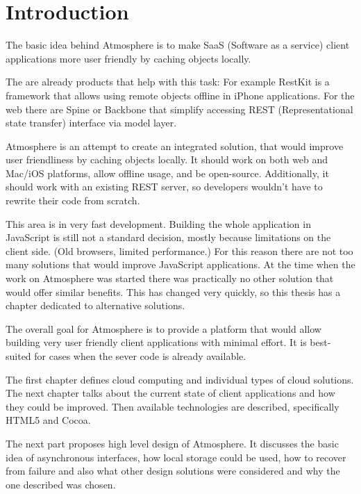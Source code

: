 \setcounter{page}{1}
\setcounter{equation}{0}
\setcounter{figure}{0}
\setcounter{table}{0}

\section*{Introduction}

The basic idea behind Atmosphere is to make SaaS (Software as a service) client applications more user friendly by caching objects locally.

The are already products that help with this task: For example RestKit \citep{restkit} is a framework that allows using remote objects offline in iPhone applications. For the web there are Spine or Backbone \citep{maccaw_js} that simplify accessing REST (Representational state transfer) interface via model layer.

Atmosphere is an attempt to create an integrated solution, that would improve user friendliness by caching objects locally. It should work on both web and Mac/iOS platforms, allow offline usage, and be open-source. Additionally, it should work with an existing REST server, so developers wouldn't have to rewrite their code from scratch.

This area is in very fast development. Building the whole application in JavaScript is still not a standard decision, mostly because limitations on the client side. (Old browsers, limited performance.) For this reason there are not too many solutions that would improve JavaScript applications. At the time when the work on Atmosphere was started there was practically no other solution that would offer similar benefits. This has changed very quickly, so this thesis has a chapter dedicated to alternative solutions. 

The overall goal for Atmosphere is to provide a platform that would allow building very user friendly client applications with minimal effort. It is best-suited for cases when the sever code is already available.

The first chapter defines cloud computing and individual types of cloud solutions. The next chapter talks about the current state of client applications and how they could be improved. Then available technologies are described, specifically HTML5 and Cocoa.

The next part proposes high level design of Atmosphere. It discusses the basic idea of asynchronous interfaces, how local storage could be used, how to recover from failure and also what other design solutions were considered and why the one described was chosen.


